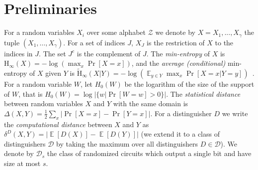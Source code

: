 \documentclass[11pt]{article}
\DeclareMathOperator*{\expe}{\mathbb{E}}
\newcommand{\class}[1]{{\ensuremath{\mathsf{#1}}}}
\newcommand{\gen}{\ensuremath{\class{Gen}}\xspace}
\newcommand{\Hoo}{\mathrm{H}_\infty}
\newcommand{\Hav}{\tilde{\mathrm{H}}_\infty}
\newcommand{\Huse}{\mathrm{H}_{\mathtt{usable}}}
\newcommand{\authnote}[2]{{\textcolor{red}{\textsf{#1 notes: }\textcolor{blue}{ #2}}\marginpar{\textcolor{red}{\textbf{!!!!!}}}}}
\newcommand{\authnote}[2]{}
\newcommand{\lnote}[1]{{\authnote{Leo}{#1}}}
\begin{document}


\section{Preliminaries}
\label{sec:preliminaries}
For a random variables $X_i$ over some alphabet $\mathcal{Z}$ we denote by $X = X_1,..., X_\gamma$  the tuple $(X_1,\dots, X_\gamma)$.  For a set of indices $J$, $X_{J}$ is the restriction of $X$ to the indices in $J$.  The set $J^c$ is the complement of $J$.  The {\em min-entropy} of $X$ is $\Hoo(X) = -\log(\max_x \Pr[X=x])$,
and the {\em average (conditional)} min-entropy of $X$ given $Y$ is  $\Hav(X|Y) = -\log(\expe_{y\in Y} \max_{x} \Pr[X=x|Y=y])$~\cite[Section 2.4]{DBLP:journals/siamcomp/DodisORS08}.   For a random variable $W$, let $H_0(W)$ be the logarithm of the size of the support of $W$,  that is $H_0(W) = \log |\{w | \Pr[W=w]>0\}|$.
The {\em statistical distance} between random variables $X$ and $Y$ with the same domain is $\Delta(X,Y) = \frac12 \sum_x |\Pr[X=x] - \Pr[Y=x]|$.
For a distinguisher $D$ we write the \emph{computational distance} between $X$ and $Y$ as $\delta^D(X,Y) = \left| \expe[D(X)]-\expe[D(Y)]\right |$ (we extend it to a class of distinguishers $\mathcal{D}$ by taking the maximum over all distinguishers $D\in\mathcal{D}$).  We denote by $\mathcal{D}_{s}$ the class of randomized circuits which output a single bit and have size at most $s$.
\end{document}
